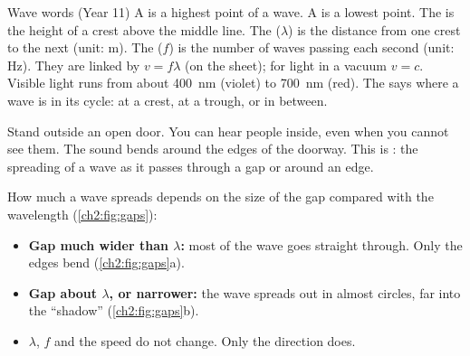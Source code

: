 \begin{refresher}{Wave words (Year 11)}
A  is a highest point of a wave. A  is a lowest point. The
 is the height of a crest above the middle line. The 
($\lambda$) is the distance from one crest to the next (unit: m). The 
($f$) is the number of waves passing each second (unit: Hz). They are linked by
$v = f\lambda$ (on the sheet); for light in a vacuum $v = c$. Visible light runs from about
\qty{400}{nm} (violet) to \qty{700}{nm} (red). The  says where a wave is in
its cycle: at a crest, at a trough, or in between.
\end{refresher}

Stand outside an open door. You can hear people inside, even when you cannot see them.
The sound bends around the edges of the doorway. This is : the
spreading of a wave as it passes through a gap or around an edge.

How much a wave spreads depends on the size of the gap compared with the wavelength
(\cref{ch2:fig:gaps}):
\begin{itemize}
  \item \textbf{Gap much wider than $\lambda$:} most of the wave goes straight through.
        Only the edges bend (\cref{ch2:fig:gaps}a).
  \item \textbf{Gap about $\lambda$, or narrower:} the wave spreads out in almost
        circles, far into the ``shadow'' (\cref{ch2:fig:gaps}b).
  \item $\lambda$, $f$ and the speed do not change. Only the direction does.
\end{itemize}

